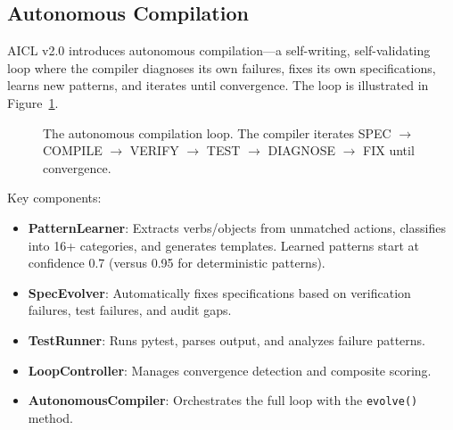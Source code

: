 \documentclass[11pt]{article}
\newcommand{\aicl}{\textsc{AICL}}
\begin{document}
\subsection{Autonomous Compilation}
\label{sec:aicl:autonomous}

\aicl{} v2.0 introduces autonomous compilation---a self-writing, self-validating loop where the compiler diagnoses its own failures, fixes its own specifications, learns new patterns, and iterates until convergence. The loop is illustrated in Figure~\ref{fig:autonomous-loop}.

\begin{figure}[htbp]
\centering
{}
\caption{The autonomous compilation loop. The compiler iterates SPEC $\to$ COMPILE $\to$ VERIFY $\to$ TEST $\to$ DIAGNOSE $\to$ FIX until convergence.}
\label{fig:autonomous-loop}
\end{figure}

Key components:
\begin{itemize}[leftmargin=*,itemsep=1pt]
  \item \textbf{PatternLearner}: Extracts verbs/objects from unmatched actions, classifies into 16+ categories, and generates templates. Learned patterns start at confidence 0.7 (versus 0.95 for deterministic patterns).
  \item \textbf{SpecEvolver}: Automatically fixes specifications based on verification failures, test failures, and audit gaps.
  \item \textbf{TestRunner}: Runs pytest, parses output, and analyzes failure patterns.
  \item \textbf{LoopController}: Manages convergence detection and composite scoring.
  \item \textbf{AutonomousCompiler}: Orchestrates the full loop with the \texttt{evolve()} method.
\end{itemize}
\end{document}
